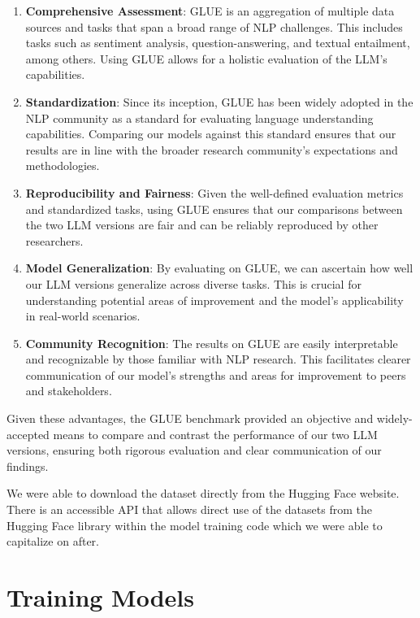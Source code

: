 \documentclass[\main/thesis.tex]{subfiles}
\begin{document}
\begin{enumerate}
    \item \textbf{Comprehensive Assessment}: GLUE is an aggregation of multiple data sources and 
    tasks that span a broad range of NLP challenges. This includes tasks such as sentiment analysis, 
    question-answering, and textual entailment, among others. Using GLUE allows for a holistic 
    evaluation of the LLM's capabilities.

    \item \textbf{Standardization}: Since its inception, GLUE has been widely adopted in the 
    NLP community as a standard for evaluating language understanding capabilities. 
    Comparing our models against this standard ensures that our results are in line with 
    the broader research community's expectations and methodologies.

    \item \textbf{Reproducibility and Fairness}: Given the well-defined evaluation metrics and 
    standardized tasks, using GLUE ensures that our comparisons between the two LLM versions are 
    fair and can be reliably reproduced by other researchers.

    \item \textbf{Model Generalization}: By evaluating on GLUE, we can ascertain how well our 
    LLM versions generalize across diverse tasks. This is crucial for understanding potential 
    areas of improvement and the model's applicability in real-world scenarios.

    \item \textbf{Community Recognition}: The results on GLUE are easily interpretable and 
    recognizable by those familiar with NLP research. This facilitates clearer communication of 
    our model's strengths and areas for improvement to peers and stakeholders.

\end{enumerate}

Given these advantages, the GLUE benchmark provided an objective and widely-accepted means 
to compare and contrast the performance of our two LLM versions, ensuring both rigorous 
evaluation and clear communication of our findings.

We were able to download the dataset directly from the Hugging Face website. There is an accessible
API that allows direct use of the datasets from the Hugging Face library within the model 
training code which we were able to capitalize on after. 

\section{Training Models}\label{sec:ModelTraining}
\end{document}
